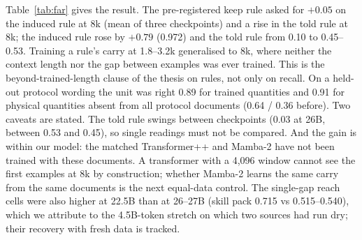 \documentclass[11pt]{article}
\newcommand{\tpp}{Transformer++}
\newcommand{\mamba}{Mamba-2}
\begin{document}
Table~\ref{tab:far} gives the result. The pre-registered keep rule asked for $+0.05$ on the induced rule at 8k (mean of three checkpoints) and a rise in the told rule at 8k; the induced rule rose by $+0.79$ (0.972) and the told rule from 0.10 to 0.45--0.53. Training a rule's carry at 1.8--3.2k generalised to 8k, where neither the context length nor the gap between examples was ever trained. This is the beyond-trained-length clause of the thesis on rules, not only on recall. On a held-out protocol wording the unit was right 0.89 for trained quantities and 0.91 for physical quantities absent from all protocol documents (0.64 / 0.36 before). Two caveats are stated. The told rule swings between checkpoints (0.03 at 26B, between 0.53 and 0.45), so single readings must not be compared. And the gain is within our model: the matched \tpp{} and \mamba{} have not been trained with these documents. A transformer with a 4,096 window cannot see the first examples at 8k by construction; whether \mamba{} learns the same carry from the same documents is the next equal-data control. The single-gap reach cells were also higher at 22.5B than at 26--27B (skill pack 0.715 vs 0.515--0.540), which we attribute to the 4.5B-token stretch on which two sources had run dry; their recovery with fresh data is tracked.
\end{document}
